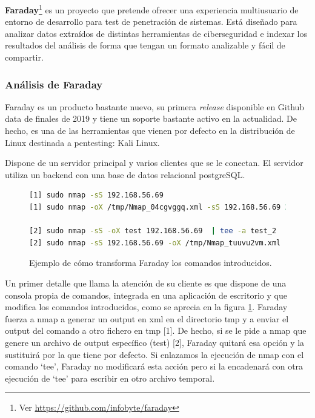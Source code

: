 \textbf{Faraday}\footnote{Ver \url{https://github.com/infobyte/faraday}} es un proyecto que pretende ofrecer una experiencia multiusuario de entorno de desarrollo para test de penetración de sistemas. Está diseñado para analizar datos extraídos de distintas herramientas de ciberseguridad e indexar los resultados del análisis de forma que tengan un formato analizable y fácil de compartir.

\subsubsection{Análisis de Faraday}

Faraday es un producto bastante nuevo, su primera \textit{release} disponible en Github data de finales de 2019 y tiene un soporte bastante activo en la actualidad. De hecho, es una de las herramientas que vienen por defecto en la distribución de Linux destinada a pentesting: Kali Linux.

Dispone de un servidor principal y varios clientes que se le conectan. El servidor utiliza un backend con una base de datos relacional postgreSQL. 

\begin{figure}
\begin{lstlisting}[language=bash,caption={Ejemplos de transformaciones de código hechas por Faraday}]
[1] sudo nmap -sS 192.168.56.69
[1] sudo nmap -oX /tmp/Nmap_04cgvggq.xml -sS 192.168.56.69 2>&1 | tee -a tmp.MCqWwd589v0Lk6l0bThFlEsrXWkhQ 

[2] sudo nmap -sS -oX test 192.168.56.69  | tee -a test_2
[2] sudo nmap -sS 192.168.56.69 -oX /tmp/Nmap_tuuvu2vm.xml | tee -a aedeje 2>&1 | tee -a tmp.qulP2E4IPQVgGzteTTQilsSOoe74c
\end{lstlisting}
\caption{Ejemplo de cómo transforma Faraday los comandos introducidos.}
\label{farday_transformation}
\end{figure}


Un primer detalle que llama la atención de su cliente es que dispone de una consola propia de comandos, integrada en una aplicación de escritorio y que modifica los comandos introducidos, como se aprecia en la figura \ref{farday_transformation}. Faraday fuerza a nmap a generar un output en xml en el directorio tmp y a enviar el output del comando a otro fichero en tmp [1]. De hecho, si se le pide a nmap que genere un archivo de output específico (test) [2], Faraday quitará esa opción y la sustituirá por la que tiene por defecto. Si enlazamos la ejecución de nmap con el comando `tee', Faraday no modificará esta acción pero si la encadenará con otra ejecución de `tee' para escribir en otro archivo temporal. 


